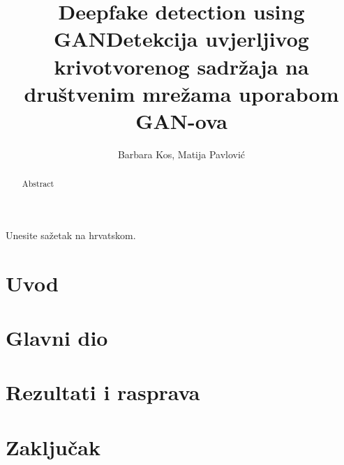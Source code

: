 \documentclass[seminarski, times, utf8]{fer}
\title{Deepfake detection using GAN}
\title{Detekcija uvjerljivog krivotvorenog sadržaja na društvenim mrežama uporabom GAN-ova}
\author{Barbara Kos, Matija Pavlović}
\date{}
\date{}
\begin{document}
\maketitle



\begin{sazetak}
  Unesite sažetak na hrvatskom.
\end{sazetak}

\begin{kljucnerijeci}
 
\end{kljucnerijeci}

\begin{abstract}
  Abstract
\end{abstract}

\begin{keywords}
 
\end{keywords}


\tableofcontents


\chapter{Uvod}
\label{pog:uvod}




\chapter{Glavni dio}
\label{pog:glavni_dio}




\chapter{Rezultati i rasprava}
\label{pog:rezultati_i_rasprava}




\chapter{Zaključak}
\label{pog:zakljucak}
\end{document}

